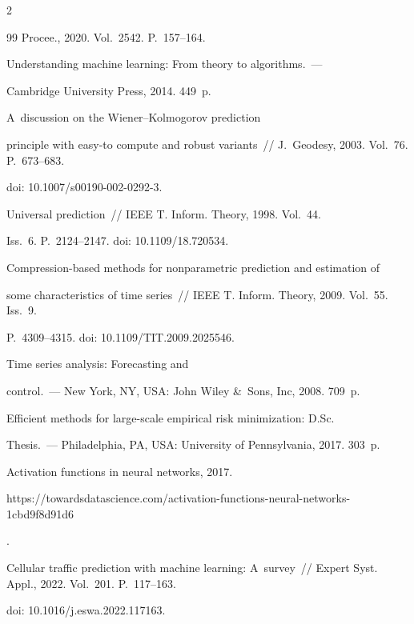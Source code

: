 \begin{multicols}{2}
{{\begin{thebibliography}{99}
Procee., 2020. Vol.~2542. P.~157--164. 




 Understanding machine learning: From theory to algorithms.~--- 


Cambridge University Press, 2014. 449~p.




 A~discussion on the Wiener--Kolmogorov prediction 


principle with easy-to compute and robust variants~// J.~Geodesy, 2003. Vol.~76. P.~673--683.


doi: 10.1007/s00190-002-0292-3.




 Universal prediction~// IEEE T. Inform. Theory, 1998. Vol.~44. 


Iss.~6. P.~2124--2147. doi: 10.1109/18.720534.




 Compression-based methods for nonparametric prediction and estimation of 


some characteristics of time series~// IEEE T. Inform. Theory, 2009. Vol.~55. Iss.~9.  


P.~4309--4315. doi: 10.1109/TIT.2009.2025546.




 Time series analysis: Forecasting and  


control.~--- New York, NY, USA: John Wiley \&~Sons, Inc, 2008. 709~p.




 Efficient methods for large-scale empirical risk minimization: D.Sc. 


Thesis.~--- Philadelphia, PA, USA: University of Pennsylvania, 2017. 303~p.




 Activation functions in neural networks, 2017. {\sf 


https://towardsdatascience.com/activation-functions-neural-networks-1cbd9f8d91d6}.




 Cellular traffic prediction with machine learning: A~survey~// Expert Syst. Appl., 2022. Vol.~201. P.~117--163. 


doi: 10.1016/j.eswa.2022.117163.



\end{thebibliography}}}
\end{multicols}
